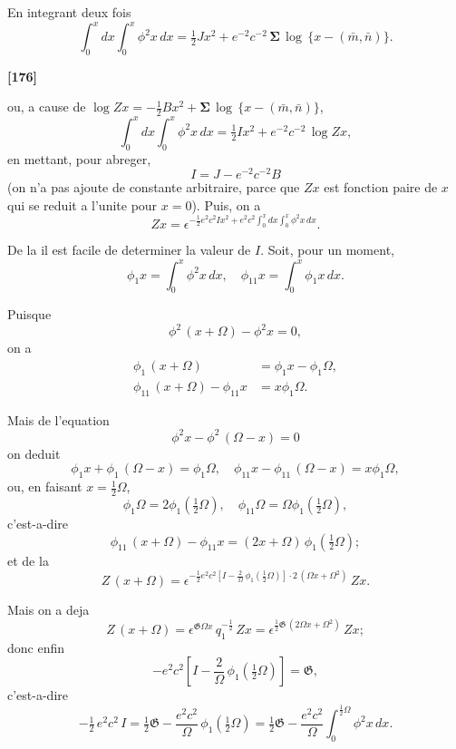 \documentclass[11pt,a4paper]{book}
\begin{document}
En integrant deux fois
\begin{equation}
\int_0^x dx \int_0^x \phi^2 x\, dx = \tfrac{1}{2}Jx^2 + e^{-2} c^{-2}\, \boldsymbol{\Sigma}\, \log\, \{x - (\bar{m}, \bar{n})\}. \tag{41}
\end{equation}

\textbf{[176]}

ou, a cause de $\log Zx = -\frac{1}{2}Bx^2 + \boldsymbol{\Sigma}\, \log\, \{x - (\bar{m}, \bar{n})\}$,
\begin{equation}
\int_0^x dx \int_0^x \phi^2 x\, dx = \tfrac{1}{2}Ix^2 + e^{-2} c^{-2}\, \log Zx, \tag{42}
\end{equation}
en mettant, pour abreger,
\[I = J - e^{-2} c^{-2} B\]
(on n'a pas ajoute de constante arbitraire, parce que $Zx$ est fonction paire de $x$ qui se
reduit a l'unite pour $x = 0$). Puis, on a
\begin{equation}
Zx = \epsilon^{-\frac{1}{2}e^2 c^2 Ix^2 + e^2 c^2 \int_0^x dx \int_0^x \phi^2 x\, dx}. \tag{43}
\end{equation}

De la il est facile de determiner la valeur de $I$. Soit, pour un moment,
\[\phi_1 x = \int_0^x \phi^2 x\, dx,\quad \phi_{11} x = \int_0^x \phi_1 x\, dx.\]

Puisque
\[\phi^2\, (x + \Omega) - \phi^2 x = 0,\]
on a
\begin{align*}
\phi_1\, (x + \Omega) &= \phi_1 x - \phi_1 \Omega,\\
\phi_{11}\, (x + \Omega) - \phi_{11} x &= x\phi_1 \Omega.
\end{align*}

Mais de l'equation
\[\phi^2 x - \phi^2\, (\Omega - x) = 0\]
on deduit
\[\phi_1 x + \phi_1\, (\Omega - x) = \phi_1 \Omega,\quad \phi_{11} x - \phi_{11}\, (\Omega - x) = x\phi_1 \Omega,\]
ou, en faisant $x = \frac{1}{2}\Omega$,
\[\phi_1 \Omega = 2\phi_1\left(\tfrac{1}{2}\Omega\right),\quad \phi_{11} \Omega = \Omega\phi_1\left(\tfrac{1}{2}\Omega\right),\]
c'est-a-dire
\[\phi_{11}\, (x + \Omega) - \phi_{11} x = (2x + \Omega)\, \phi_1\left(\tfrac{1}{2}\Omega\right);\]
et de la
\[Z\, (x + \Omega) = \epsilon^{-\frac{1}{2}e^2 c^2\left[I - \frac{2}{\Omega}\, \phi_1\left(\frac{1}{2}\Omega\right)\right] \cdot 2\, (\Omega x + \Omega^2)}\, Zx.\]

Mais on a deja
\[Z\, (x + \Omega) = \epsilon^{\mathfrak{G}\Omega x}\, q_1^{-\frac{1}{2}}\, Zx = \epsilon^{\frac{1}{2}\mathfrak{G}\, (2\Omega x + \Omega^2)}\, Zx;\]
donc enfin
\[-e^2 c^2 \left[I - \frac{2}{\Omega}\, \phi_1\left(\tfrac{1}{2}\Omega\right)\right] = \mathfrak{G},\]
c'est-a-dire
\begin{equation}
-\tfrac{1}{2}\, e^2 c^2\, I = \tfrac{1}{2}\mathfrak{G} - \frac{e^2 c^2}{\Omega}\, \phi_1\left(\tfrac{1}{2}\Omega\right) = \tfrac{1}{2}\mathfrak{G} - \frac{e^2 c^2}{\Omega} \int_0^{\frac{1}{2}\Omega} \phi^2 x\, dx. \tag{44}
\end{equation}
\end{document}
